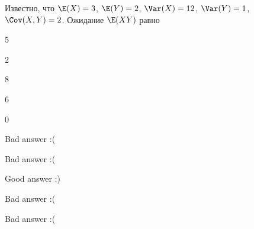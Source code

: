 
\begin{question}
Известно, что \(\E(X)=3\), \(\E(Y)=2\), \(\Var(X)=12\), \(\Var(Y)=1\),
\(\Cov(X,Y)=2\). Ожидание \(\E(XY)\) равно
\begin{answerlist}
  \item 5
  \item 2
  \item 8
  \item 6
  \item 0
\end{answerlist}
\end{question}

\begin{solution}
\begin{answerlist}
  \item Bad answer :(
  \item Bad answer :(
  \item Good answer :)
  \item Bad answer :(
  \item Bad answer :(
\end{answerlist}
\end{solution}

